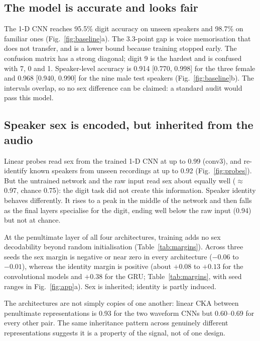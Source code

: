 \documentclass[conference]{IEEEtran}
\begin{document}
\subsection{The model is accurate and looks fair}
The 1-D CNN reaches 95.5\% digit accuracy on unseen speakers and 98.7\% on
familiar ones (Fig.~\ref{fig:baseline}a). The 3.3-point gap is voice
memorisation that does not transfer, and is a lower bound because training
stopped early. The confusion matrix has a strong diagonal; digit 9 is the
hardest and is confused with 7, 0 and 1. Speaker-level accuracy is 0.914
[0.770, 0.998] for the three female and 0.968 [0.940, 0.990] for the nine
male test speakers (Fig.~\ref{fig:baseline}b). The intervals overlap, so no
sex difference can be claimed: a standard audit would pass this model.

\subsection{Speaker sex is encoded, but inherited from the audio}
Linear probes read sex from the trained 1-D CNN at up to 0.99 (conv3), and
re-identify known speakers from unseen recordings at up to 0.92
(Fig.~\ref{fig:probes}). But the untrained
network and the raw input read sex about equally well ($\approx$0.97, chance
0.75): the digit task did not create this information. Speaker identity
behaves differently. It rises to a peak in the middle of the network and then
falls as the final layers specialise for the digit, ending well below the raw
input (0.94) but not at chance.

At the penultimate layer of all four architectures, training adds no sex
decodability beyond random initialisation (Table~\ref{tab:margins}). Across
three seeds the sex margin is negative or near zero in every architecture
($-0.06$ to $-0.01$), whereas the identity margin is positive (about $+0.08$
to $+0.13$ for the convolutional models and $+0.38$ for the GRU;
Table~\ref{tab:margins}, with seed ranges in Fig.~\ref{fig:app}a). Sex is inherited; identity is partly induced.

The architectures are not simply copies of one another: linear CKA between
penultimate representations is 0.93 for the two waveform CNNs but 0.60--0.69
for every other pair. The same inheritance pattern across genuinely different
representations suggests it is a property of the signal, not of one design.
\end{document}
